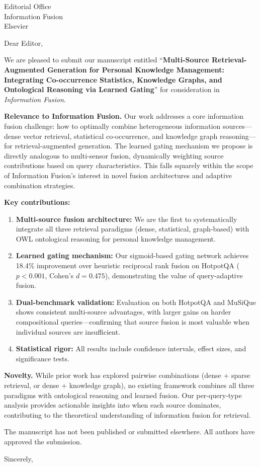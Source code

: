 \documentclass[12pt]{letter}
\begin{document}
\begin{letter}{Editorial Office\\Information Fusion\\Elsevier}

\opening{Dear Editor,}

We are pleased to submit our manuscript entitled ``\textbf{Multi-Source Retrieval-Augmented Generation for Personal Knowledge Management: Integrating Co-occurrence Statistics, Knowledge Graphs, and Ontological Reasoning via Learned Gating}'' for consideration in \textit{Information Fusion}.

\textbf{Relevance to Information Fusion.} Our work addresses a core information fusion challenge: how to optimally combine heterogeneous information sources---dense vector retrieval, statistical co-occurrence, and knowledge graph reasoning---for retrieval-augmented generation. The learned gating mechanism we propose is directly analogous to multi-sensor fusion, dynamically weighting source contributions based on query characteristics. This falls squarely within the scope of Information Fusion's interest in novel fusion architectures and adaptive combination strategies.

\textbf{Key contributions:}
\begin{enumerate}
    \item \textbf{Multi-source fusion architecture:} We are the first to systematically integrate all three retrieval paradigms (dense, statistical, graph-based) with OWL ontological reasoning for personal knowledge management.
    
    \item \textbf{Learned gating mechanism:} Our sigmoid-based gating network achieves 18.4\% improvement over heuristic reciprocal rank fusion on HotpotQA ($p<0.001$, Cohen's $d=0.475$), demonstrating the value of query-adaptive fusion.
    
    \item \textbf{Dual-benchmark validation:} Evaluation on both HotpotQA and MuSiQue shows consistent multi-source advantages, with larger gains on harder compositional queries---confirming that source fusion is most valuable when individual sources are insufficient.
    
    \item \textbf{Statistical rigor:} All results include confidence intervals, effect sizes, and significance tests.
\end{enumerate}

\textbf{Novelty.} While prior work has explored pairwise combinations (dense + sparse retrieval, or dense + knowledge graph), no existing framework combines all three paradigms with ontological reasoning and learned fusion. Our per-query-type analysis provides actionable insights into when each source dominates, contributing to the theoretical understanding of information fusion for retrieval.

The manuscript has not been published or submitted elsewhere. All authors have approved the submission.

\closing{Sincerely,}

\end{letter}
\end{document}
